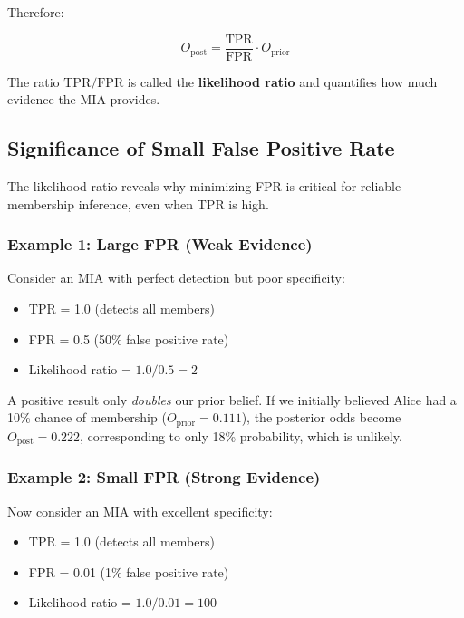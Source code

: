 \documentclass[11pt,letterpaper]{article}
\begin{document}
Therefore:

\begin{equation}
    \boxed{O_{\text{post}} = \frac{\text{TPR}}{\text{FPR}} \cdot O_{\text{prior}}}
\end{equation}

The ratio $\text{TPR}/\text{FPR}$ is called the \textbf{likelihood ratio} and quantifies how much evidence the MIA provides.

\subsection{Significance of Small False Positive Rate}

The likelihood ratio reveals why minimizing FPR is critical for reliable membership inference, even when TPR is high.

\subsubsection{Example 1: Large FPR (Weak Evidence)}

Consider an MIA with perfect detection but poor specificity:
\begin{itemize}[leftmargin=*]
    \item TPR = 1.0 (detects all members)
    \item FPR = 0.5 (50\% false positive rate)
    \item Likelihood ratio = $1.0 / 0.5 = 2$
\end{itemize}

A positive result only \textit{doubles} our prior belief. If we initially believed Alice had a 10\% chance of membership ($O_{\text{prior}} = 0.111$), the posterior odds become $O_{\text{post}} = 0.222$, corresponding to only 18\% probability, which is unlikely.

\subsubsection{Example 2: Small FPR (Strong Evidence)}

Now consider an MIA with excellent specificity:
\begin{itemize}[leftmargin=*]
    \item TPR = 1.0 (detects all members)
    \item FPR = 0.01 (1\% false positive rate)
    \item Likelihood ratio = $1.0 / 0.01 = 100$
\end{itemize}
\end{document}
